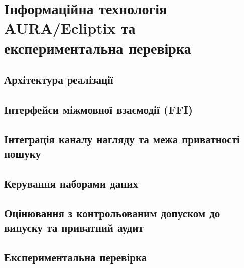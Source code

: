 \chapter{Інформаційна технологія AURA/Ecliptix та експериментальна перевірка}
\label{ch:infotech}


\section{Архітектура реалізації}
\label{sec:impl-arch}

\section{Інтерфейси міжмовної взаємодії (FFI)}
\label{sec:impl-ffi}

\section{Інтеграція каналу нагляду та межа приватності пошуку}
\label{sec:impl-integration}

\section{Керування наборами даних}
\label{sec:dataset-governance}

\section{Оцінювання з контрольованим допуском до випуску та приватний аудит}
\label{sec:release-eval}

\section{Експериментальна перевірка}
\label{sec:experiments}

